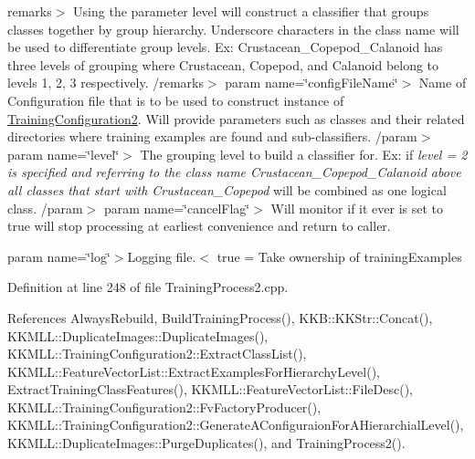 remarks$>$ Using the parameter level will construct a classifier that groups classes together by group hierarchy. Underscore characters in the class name will be used to differentiate group levels. Ex\+: Crustacean\+\_\+\+Copepod\+\_\+\+Calanoid has three levels of grouping where Crustacean, Copepod, and Calanoid belong to levels 1, 2, 3 respectively. /remarks$>$ param name=\char`\"{}config\+File\+Name\char`\"{}$>$ Name of Configuration file that is to be used to construct instance of \hyperlink{class_k_k_m_l_l_1_1_training_configuration2}{Training\+Configuration2}. Will provide parameters such as classes and their related directories where training examples are found and sub-\/classifiers. /param$>$ param name=\char`\"{}level\char`\"{}$>$ The grouping level to build a classifier for. Ex\+: if {\itshape level = 2 is specified and referring to the class name Crustacean\+\_\+\+Copepod\+\_\+\+Calanoid above all classes that start with Crustacean\+\_\+\+Copepod} will be combined as one logical class. /param$>$ param name=\char`\"{}cancel\+Flag\char`\"{}$>$ Will monitor if it ever is set to true will stop processing at earliest convenience and return to caller. 

param name=\char`\"{}log\char`\"{}$>$Logging file.$<$ true = Take ownership of \textquotesingle{}training\+Examples\textquotesingle{} 

Definition at line 248 of file Training\+Process2.\+cpp.



References Always\+Rebuild, Build\+Training\+Process(), K\+K\+B\+::\+K\+K\+Str\+::\+Concat(), K\+K\+M\+L\+L\+::\+Duplicate\+Images\+::\+Duplicate\+Images(), K\+K\+M\+L\+L\+::\+Training\+Configuration2\+::\+Extract\+Class\+List(), K\+K\+M\+L\+L\+::\+Feature\+Vector\+List\+::\+Extract\+Examples\+For\+Hierarchy\+Level(), Extract\+Training\+Class\+Features(), K\+K\+M\+L\+L\+::\+Feature\+Vector\+List\+::\+File\+Desc(), K\+K\+M\+L\+L\+::\+Training\+Configuration2\+::\+Fv\+Factory\+Producer(), K\+K\+M\+L\+L\+::\+Training\+Configuration2\+::\+Generate\+A\+Configuraion\+For\+A\+Hierarchial\+Level(), K\+K\+M\+L\+L\+::\+Duplicate\+Images\+::\+Purge\+Duplicates(), and Training\+Process2().


